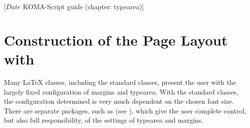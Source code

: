 %
%
%
%
%
%
%
%
% 
%
%
%
%

%
                 [$Date$
                  KOMA-Script guide (chapter: typearea)]


\chapter{Construction of the Page Layout with }
\BeginIndexGroup
{}

Many {\LaTeX} classes, including the standard classes, present the user
with the largely fixed configuration of margins and typearea. With the
standard classes, the configuration determined is very much dependent
on the chosen font size. There are
separate packages, such as
 (see
\cite{package:geometry}), which give the user complete control, but
also full responsibility, of the settings of typearea and margins.

